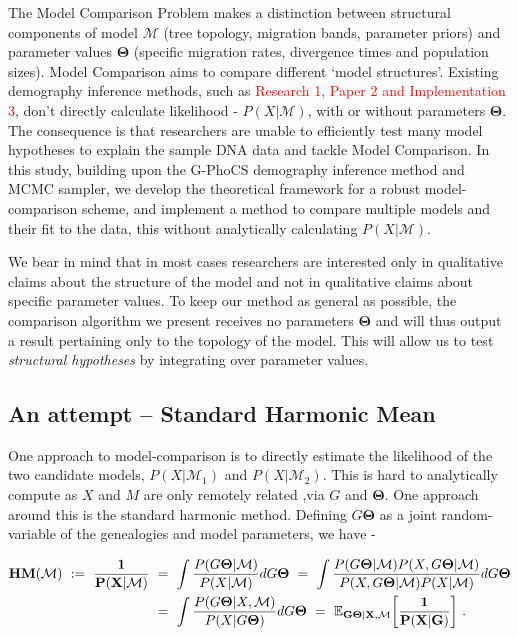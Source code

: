 \documentclass[11pt]{article}
\newcommand{\vect}[1]{\boldsymbol{\mathbf{#1}}}
\newcommand{\E}{\mathbb{E}}
\newcommand{\M}{\mathcal{M}}
\newcommand{\T}{\vect{\Theta}}
\newcommand{\1}{\mathbbm{1}}
\newcommand{\gp}{G-PhoCS }
\begin{document}
The Model Comparison Problem makes a distinction between structural components of model $\M$ (tree topology, migration bands, parameter priors) and parameter values $\T$ (specific migration rates, divergence times and population sizes). Model Comparison aims to compare different ‘model structures’.
%
Existing demography inference methods, such as \textcolor{red}{ Research 1, Paper 2 and Implementation 3}, don’t directly calculate likelihood - $P(X|\M)$, with or without parameters $\T$. The consequence is that researchers are unable to efficiently test many model hypotheses to explain the sample DNA data and tackle Model Comparison.
%
In this study, building upon the \gp demography inference method and MCMC sampler, we develop the theoretical framework for a robust model-comparison scheme, and implement a method to compare multiple models and their fit to the data, this without analytically calculating $P(X|\M)$.

We bear in mind that in most cases researchers are interested only in qualitative claims about the structure
of the model and not in qualitative claims about specific parameter values. To keep our method as
general as possible, the comparison algorithm we present receives no parameters $\T$ and will thus
output a result pertaining only to the topology of the model. This will allow us to test \textit{structural
hypotheses} by integrating over parameter values.

\subsection{An attempt – Standard Harmonic Mean}
One approach to model-comparison is to directly estimate the likelihood of the two candidate models, $P(X|\M_1)$  and  $P(X|\M_2)$. This is hard to analytically compute as $X$ and $M$ are only remotely related ,via $G$ and $\T$. One approach around this is the standard harmonic method. Defining $G\T$ as a joint random-variable of the genealogies and model parameters, we have - 

\begin{small}
\begin{align}
\mathbf{ HM(\M) ~:=~ \frac{1}{P(X|\M)} } ~&=~ \int \frac{P(G\T|\M)}{P(X|\M)} dG\T ~=~ \int \frac{P(G\T|\M)P(X,G\T|\M)}{P(X,G\T|\M)P(X|\M)}   dG\T \notag \\ 
%
&=~ \int \frac{P(G\T|X,\M)}{P(X|G\T)} dG\T ~=~ \mathbf{\E_{G\T|X,\M}\bigg[\frac{1}{P(X|G)}\bigg]} ~. 
\label{eq:harmonic_mean_estimator}
\end{align}
\end{small}
\end{document}
